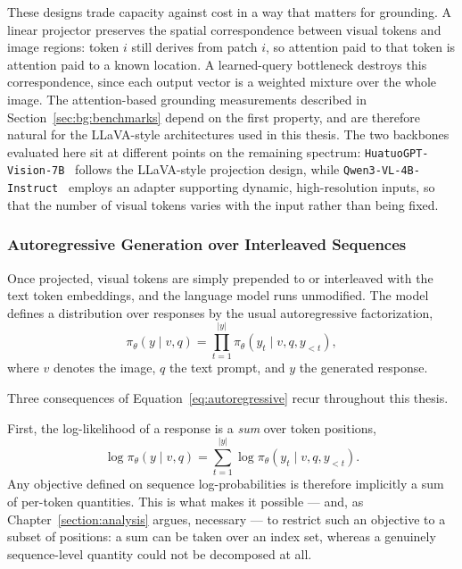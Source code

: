 These designs trade capacity against cost in a way that matters for grounding. A linear projector preserves the spatial correspondence between visual tokens and image regions: token $i$ still derives from patch $i$, so attention paid to that token is attention paid to a known location. A learned-query bottleneck destroys this correspondence, since each output vector is a weighted mixture over the whole image. The attention-based grounding measurements described in Section~\ref{sec:bg:benchmarks} depend on the first property, and are therefore natural for the LLaVA-style architectures used in this thesis. The two backbones evaluated here sit at different points on the remaining spectrum: \texttt{HuatuoGPT-Vision-7B}~\cite{chen2024towards} follows the LLaVA-style projection design, while \texttt{Qwen3-VL-4B-Instruct}~\cite{bai2025qwen3} employs an adapter supporting dynamic, high-resolution inputs, so that the number of visual tokens varies with the input rather than being fixed.

\subsubsection{Autoregressive Generation over Interleaved Sequences}

Once projected, visual tokens are simply prepended to or interleaved with the text token embeddings, and the language model runs unmodified. The model defines a distribution over responses by the usual autoregressive factorization,
\begin{equation}\label{eq:autoregressive}
\pi_\theta(y \mid v, q) = \prod_{t=1}^{|y|} \pi_\theta(y_t \mid v, q, y_{<t}),
\end{equation}
where $v$ denotes the image, $q$ the text prompt, and $y$ the generated response.

Three consequences of Equation~\ref{eq:autoregressive} recur throughout this thesis.

First, the log-likelihood of a response is a \emph{sum} over token positions,
\begin{equation}\label{eq:logprob-sum}
\log \pi_\theta(y \mid v,q) = \sum_{t=1}^{|y|} \log \pi_\theta(y_t \mid v,q,y_{<t}).
\end{equation}
Any objective defined on sequence log-probabilities is therefore implicitly a sum of per-token quantities. This is what makes it possible --- and, as Chapter~\ref{section:analysis} argues, necessary --- to restrict such an objective to a subset of positions: a sum can be taken over an index set, whereas a genuinely sequence-level quantity could not be decomposed at all.

